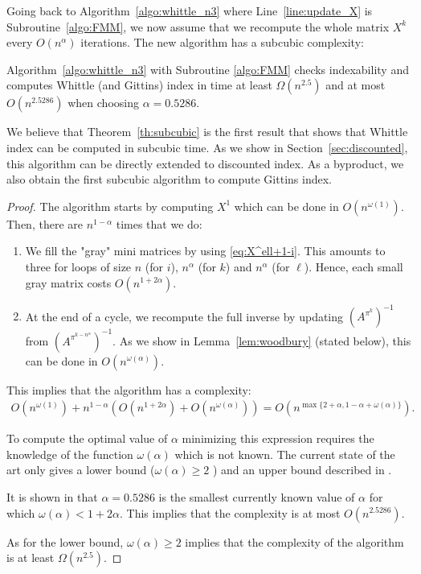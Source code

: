 \documentclass[acmsmall,screen,anonymous]{acmart}
\begin{document}

Going back to Algorithm~\ref{algo:whittle_n3} where Line~\ref{line:update_X} is Subroutine~\ref{algo:FMM}, we now assume that we recompute the whole matrix $X^k$ every $O(n^\alpha)$ iterations. The new algorithm has a subcubic complexity:

\begin{theorem}
    \label{th:subcubic}
    Algorithm~\ref{algo:whittle_n3} with Subroutine \ref{algo:FMM} checks indexability and computes Whittle (and Gittins) index in time at least $\Omega(n^{2.5})$ and at most $O(n^{2.5286})$ when choosing $\alpha=0.5286$.
\end{theorem}

We believe that Theorem~\ref{th:subcubic} is the first result that shows that Whittle index can be computed in subcubic time. As we show in Section~\ref{sec:discounted}, this algorithm can be directly extended to discounted index. As a byproduct, we also obtain the first subcubic algorithm to compute Gittins index.


\begin{proof}
     The algorithm starts by computing $X^1$ which can be done in $O(n^{\omega(1)})$. Then, there are $n^{1-\alpha}$ times that we do:
    \begin{enumerate}
    \item We fill the "gray" mini matrices by using \eqref{eq:X^ell+1-i}. This amounts to three for loops of size $n$ (for $i$), $n^\alpha$ (for $k$) and $n^\alpha$ (for $\ell$). Hence, each small gray matrix costs $O(n^{1+2\alpha})$.
    \item At the end of a cycle, we recompute the full inverse by updating $(A^{\pi^k})^{-1}$ from $(A^{\pi^{k-n^\alpha}})^{-1}$. As we show in Lemma~\ref{lem:woodbury} (stated below), this can be done in $O(n^{\omega(\alpha)})$.
\end{enumerate}
This implies that the algorithm has a complexity:
\begin{align*}
    O(n^{\omega(1)}) + n^{1-\alpha} \left(O(n^{1+2\alpha})+O(n^{\omega(\alpha)})\right)  = O(n^{\max\{2+\alpha, 1-\alpha + \omega(\alpha)\}}).
\end{align*}

To compute the optimal value of $\alpha$ minimizing this expression requires the knowledge of the function 
$\omega(\alpha)$ which is  not known. The current state of the art  only gives  a lower bound ($\omega(\alpha) \geq 2$ ) and an upper bound described in  \cite{gall2018improved}.

It is shown in \cite{gall2018improved} that $\alpha=0.5286$ is the smallest currently known value of $\alpha$ for which  $\omega(\alpha)<1+2\alpha$. This implies that the complexity is  at most $O(n^{2.5286})$.

As for the lower bound,  $\omega(\alpha) \geq 2$ implies that the complexity of the
algorithm is at least  $\Omega(n^{2.5})$.
    \end{proof}
  
\end{document}
